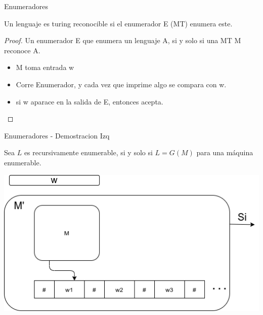 \documentclass[11pt]{beamer}
\begin{document}
		\begin{frame}{Enumeradores}
			\justifying
            \justifying
	        \begin{theorem}
                Un lenguaje es turing reconocible si el enumerador E (MT) enumera este.
            \end{theorem}
            \begin{proof}
                    Un enumerador E que enumera un lenguaje A, si y solo si una MT M reconoce A.
                    \begin{itemize}
                        \item M toma entrada w
                        \item Corre Enumerador, y cada vez que imprime algo se compara con w.
                        \item si w aparace en la salida de E, entonces acepta.
                    \end{itemize}
            \end{proof}
		\end{frame}
		\begin{frame}{Enumeradores - Demostracion Izq}
			\justifying
	        \begin{theorem}
                Sea $L$ es recursivamente enumerable, si y solo si  $L = G(M)$ para una máquina enumerable. 
            \end{theorem}
            \begin{center}
            \includegraphics[scale=0.5]{img/teo1.png}
			\end{center}
		\end{frame}
\end{document}
